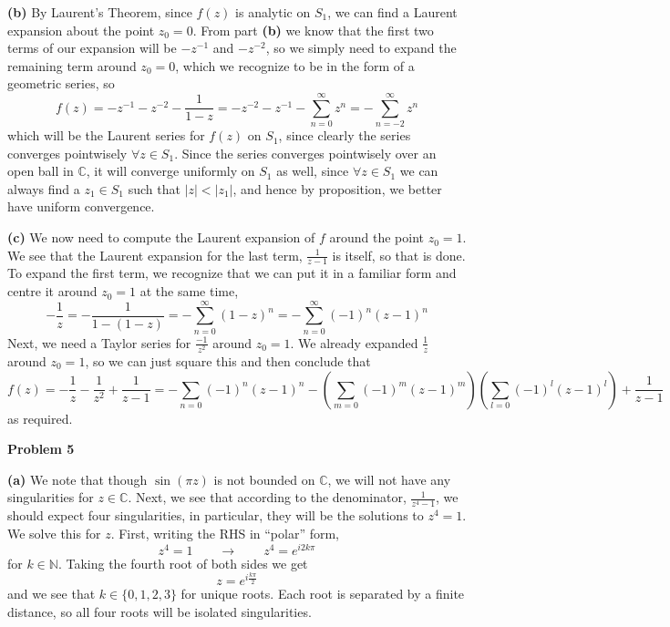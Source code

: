 \documentclass[10pt]{article}
\newcommand{\C}{\mathbb{C}}
\begin{document}
\textbf{(b)}
By Laurent's Theorem, since $f(z)$ is analytic on $S_{1}$, we can find a Laurent expansion about the point $z_{0} = 0$. From part \textbf{(b)} we know that the first two terms of our expansion will be $-z^{-1}$ and $-z^{-2}$, so we simply need to expand the remaining term around $z_{0} = 0$, which we recognize to be in the form of a geometric series, so
$$f(z) = -z^{-1} - z^{-2} - \frac{1}{1-z} = -z^{-2}-z^{-1} - \sum_{n=0}^{\infty}z^{n} = -\sum_{n=-2}^{\infty}z^{n}$$
which will be the Laurent series for $f(z)$ on $S_{1}$, since clearly the series converges pointwisely $\forall z \in S_{1}$. Since the series converges pointwisely over an open ball in $\C$, it will converge uniformly on $S_{1}$ as well, since $\forall z\in S_{1}$ we can always find a $z_{1} \in S_{1}$ such that $|z| < |z_{1}|$, and hence by proposition, we better have uniform convergence.

\textbf{(c)}
We now need to compute the Laurent expansion of $f$ around the point $z_{0} = 1$. We see that the Laurent expansion for the last term, $\frac{1}{z-1}$ is itself, so that is done. To expand the first term, we recognize that we can put it in a familiar form and centre it around $z_{0} = 1$ at the same time,
$$-\frac{1}{z} = -\frac{1}{1-(1-z)} = -\sum_{n=0}^{\infty}(1-z)^{n}= -\sum_{n=0}^{\infty}(-1)^{n}(z-1)^{n}$$
Next, we need a Taylor series for $\frac{-1}{z^{2}}$ around $z_{0} = 1$. We already expanded $\frac{1}{z}$ around $z_{0}=1$, so we can just square this and then conclude that
$$f(z) = -\frac{1}{z} - \frac{1}{z^{2}} + \frac{1}{z-1} = -\sum_{n=0}(-1)^{n}(z-1)^{n} - \left(\sum_{m=0}(-1)^{m}(z-1)^{m}\right)\left(\sum_{l=0}(-1)^{l}(z-1)^{l}\right) + \frac{1}{z-1}$$
as required.


\textbf{Problem 5}

\textbf{(a)}
We note that though $\sin(\pi z)$ is not bounded on $\C$, we will not have any singularities for $z\in \C$. Next, we see that according to the denominator, $\frac{1}{z^{4} - 1}$, we should expect four singularities, in particular, they will be the solutions to $z^{4}= 1$. We solve this for $z$. First, writing the RHS in ``polar'' form,
$$z^{4} = 1 \hspace{2em} \to \hspace{2em} z^{4} = e^{i2k\pi}$$
for $k\in\mathbb{N}$. Taking the fourth root of both sides we get
$$z = e^{i\frac{k\pi}{2}}$$
and we see that $k\in \{0,1,2,3\}$ for unique roots. Each root is separated by a finite distance, so all four roots will be isolated singularities.
\end{document}

